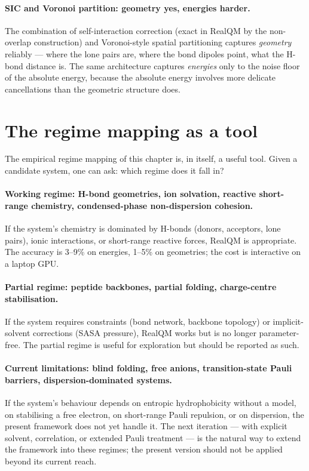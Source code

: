 \paragraph{SIC and Voronoi partition: geometry yes, energies harder.}
The combination of self-interaction correction (exact in RealQM by the non-overlap construction) and Voronoi-style spatial partitioning captures \emph{geometry} reliably --- where the lone pairs are, where the bond dipoles point, what the H-bond distance is. The same architecture captures \emph{energies} only to the noise floor of the absolute energy, because the absolute energy involves more delicate cancellations than the geometric structure does.

\section{The regime mapping as a tool}\label{sec:regime-tool}

The empirical regime mapping of this chapter is, in itself, a useful tool. Given a candidate system, one can ask: which regime does it fall in?

\paragraph{Working regime: H-bond geometries, ion solvation, reactive short-range chemistry, condensed-phase non-dispersion cohesion.}
If the system's chemistry is dominated by H-bonds (donors, acceptors, lone pairs), ionic interactions, or short-range reactive forces, RealQM is appropriate. The accuracy is 3--9\% on energies, 1--5\% on geometries; the cost is interactive on a laptop GPU.

\paragraph{Partial regime: peptide backbones, partial folding, charge-centre stabilisation.}
If the system requires constraints (bond network, backbone topology) or implicit-solvent corrections (SASA pressure), RealQM works but is no longer parameter-free. The partial regime is useful for exploration but should be reported as such.

\paragraph{Current limitations: blind folding, free anions, transition-state Pauli barriers, dispersion-dominated systems.}
If the system's behaviour depends on entropic hydrophobicity without a model, on stabilising a free electron, on short-range Pauli repulsion, or on dispersion, the present framework does not yet handle it. The next iteration --- with explicit solvent, correlation, or extended Pauli treatment --- is the natural way to extend the framework into these regimes; the present version should not be applied beyond its current reach.

